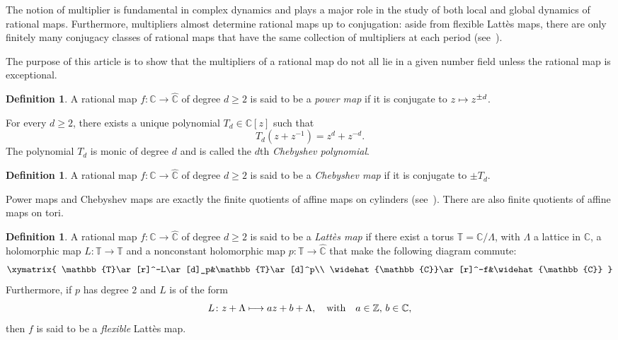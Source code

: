 \documentclass[JEP,XML,SOM,Unicode,published]{cedram}
\newcommand\mto{\mathchoice{\longmapsto}{\mapsto}{\mapsto}{\mapsto}}
\theoremstyle{plain}
\theoremstyle{definition}
\newtheorem{definition}[theorem]{Definition}
\theoremstyle{remark}
\begin{document}
The notion of multiplier is fundamental in complex dynamics and plays a major role in the study of both local and global dynamics of rational maps. Furthermore, multipliers almost determine rational maps up to conjugation: aside from flexible Lattès maps, there are only finitely many conjugacy classes of rational maps that have the same collection of multipliers at each period (see~\cite[Cor.\,2.3]{MM1987}).

The purpose of this article is to show that the multipliers of a rational map do not all lie in a given number field unless the rational map is exceptional.

\begin{definition}
A rational map $f \colon \widehat{\mathbb{C}} \to \widehat{\mathbb{C}}$ of degree $d \geq 2$ is said to be a \emph{power map} if it is conjugate to $z \mto z^{\pm d}$.
\end{definition}

For every $d \geq 2$, there exists a unique polynomial $T_{d} \in \mathbb{C}[z]$ such that
\[
T_{d}\left(z +z^{-1} \right) = z^{d} +z^{-d}.
\]
The polynomial $T_{d}$ is monic of degree $d$ and is called the $d$th \emph{Chebyshev polynomial}.

\begin{definition}
A rational map $f \colon \widehat{\mathbb{C}} \to \widehat{\mathbb{C}}$ of degree $d \geq 2$ is said to be a \emph{Chebyshev map} if it is conjugate to $\pm T_{d}$.
\end{definition}

Power maps and Chebyshev maps are exactly the finite quotients of affine maps on cylinders (see~\cite[Lem.\,3.8]{M2006}). There are also finite quotients of affine maps on tori.

\begin{definition}
A rational map $f \colon \widehat{\mathbb{C}} \to \widehat{\mathbb{C}}$ of degree $d \geq 2$ is said to be a \emph{Lattès map} if there exist a torus $\mathbb{T} = \mathbb{C}/\Lambda$, with $\Lambda$ a lattice in $\mathbb{C}$, a holomorphic map $L \colon \mathbb{T} \to \mathbb{T}$ and a nonconstant holomorphic map $p \colon \mathbb{T} \to \widehat{\mathbb{C}}$ that make the following diagram commute:
\[
\xymatrix{
\mathbb{T}\ar[r]^-L\ar[d]_p&\mathbb{T}\ar[d]^p\\
\widehat{\mathbb{C}}\ar[r]^-f&\widehat{\mathbb{C}}
}
\]
Furthermore, if $p$ has degree $2$ and $L$ is of the form
\[
L \colon z +\Lambda \mto a z +b +\Lambda, \quad \text{with} \quad a \in \mathbb{Z}, \, b \in \mathbb{C},
\]
then $f$ is said to be a \emph{flexible} Lattès map.
\end{definition}
\end{document}
